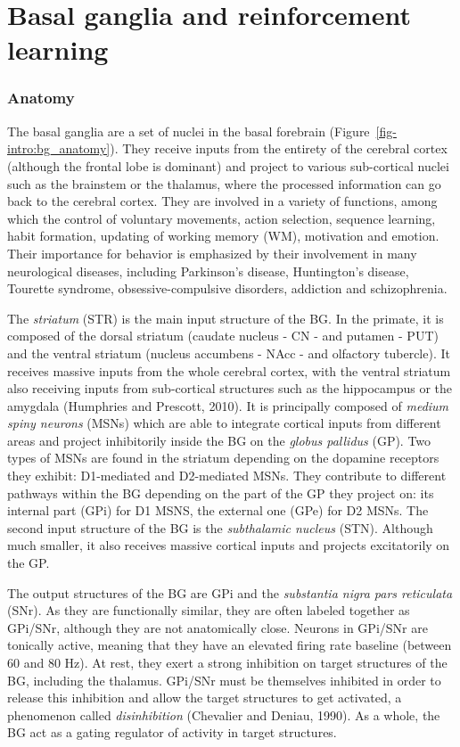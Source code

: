 \documentclass[
  11pt,
  a4paper,
]{scrbook}
\begin{document}
\section{Basal ganglia and reinforcement
learning}\label{basal-ganglia-and-reinforcement-learning}

\subsubsection*{Anatomy}\label{anatomy}

The basal ganglia are a set of nuclei in the basal forebrain
(Figure~\ref{fig-intro:bg_anatomy}). They receive inputs from the
entirety of the cerebral cortex (although the frontal lobe is dominant)
and project to various sub-cortical nuclei such as the brainstem or the
thalamus, where the processed information can go back to the cerebral
cortex. They are involved in a variety of functions, among which the
control of voluntary movements, action selection, sequence learning,
habit formation, updating of working memory (WM), motivation and
emotion. Their importance for behavior is emphasized by their
involvement in many neurological diseases, including Parkinson's
disease, Huntington's disease, Tourette syndrome, obsessive-compulsive
disorders, addiction and schizophrenia.

The \emph{striatum} (STR) is the main input structure of the BG. In the
primate, it is composed of the dorsal striatum (caudate nucleus - CN -
and putamen - PUT) and the ventral striatum (nucleus accumbens - NAcc -
and olfactory tubercle). It receives massive inputs from the whole
cerebral cortex, with the ventral striatum also receiving inputs from
sub-cortical structures such as the hippocampus or the amygdala
(Humphries and Prescott, 2010). It is principally composed of
\emph{medium spiny neurons} (MSNs) which are able to integrate cortical
inputs from different areas and project inhibitorily inside the BG on
the \emph{globus pallidus} (GP). Two types of MSNs are found in the
striatum depending on the dopamine receptors they exhibit: D1-mediated
and D2-mediated MSNs. They contribute to different pathways within the
BG depending on the part of the GP they project on: its internal part
(GPi) for D1 MSNS, the external one (GPe) for D2 MSNs. The second input
structure of the BG is the \emph{subthalamic nucleus} (STN). Although
much smaller, it also receives massive cortical inputs and projects
excitatorily on the GP.

The output structures of the BG are GPi and the \emph{substantia nigra
pars reticulata} (SNr). As they are functionally similar, they are often
labeled together as GPi/SNr, although they are not anatomically close.
Neurons in GPi/SNr are tonically active, meaning that they have an
elevated firing rate baseline (between 60 and 80 Hz). At rest, they
exert a strong inhibition on target structures of the BG, including the
thalamus. GPi/SNr must be themselves inhibited in order to release this
inhibition and allow the target structures to get activated, a
phenomenon called \emph{disinhibition} (Chevalier and Deniau, 1990). As
a whole, the BG act as a gating regulator of activity in target
structures.
\end{document}
